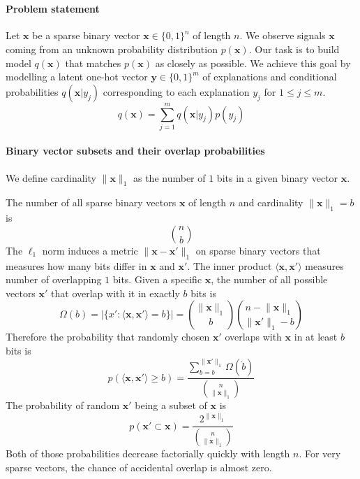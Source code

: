 \documentclass[12pt]{article}
\begin{document}
\section{}

\paragraph{Problem statement} 
Let $\boldsymbol{x}$ be a sparse binary vector $\boldsymbol{x}\in\{0,1\}^n$ of length $n$. We observe signals  $\boldsymbol{x}$ coming from an unknown probability distribution $p(\boldsymbol{x})$. Our task is to build model $q(\boldsymbol{x})$ that matches $p(\boldsymbol{x})$ as closely as possible. We achieve this goal by modelling a latent one-hot vector $\boldsymbol{y}\in\{0,1\}^m$ of explanations and conditional probabilities $q(\boldsymbol{x}|y_j)$ corresponding to each explanation $y_j$ for $1\le j\le m$.
\[
q(\boldsymbol{x}) = \sum_{j=1}^m q(\boldsymbol{x}|y_j)p(y_j)
\]


\paragraph{Binary vector subsets and their overlap probabilities} 

We define cardinality $\lVert\boldsymbol{x}\rVert_1$ as the number of $1$ bits in a given binary vector $\boldsymbol{x}$.

The number of all sparse binary vectors $\boldsymbol{x}$ of length $n$ and cardinality $\lVert\boldsymbol{x}\rVert_1=b$ is
\[\binom{n}{b}\]
The $\ell_1$ norm induces a metric $\lVert\boldsymbol{x}-\boldsymbol{x}'\rVert_1$ on sparse binary vectors that measures how many bits differ in $\boldsymbol{x}$ and $\boldsymbol{x}'$. The inner product $\langle\boldsymbol{x},\boldsymbol{x}'\rangle$ measures number of overlapping $1$ bits. 
Given a specific $\boldsymbol{x}$, the number of all possible vectors $\boldsymbol{x}'$ that overlap with it in exactly $b$ bits is 
\[
\Omega(b)=|\{x':\langle\boldsymbol{x},\boldsymbol{x}'\rangle=b\}|=\binom{\lVert\boldsymbol{x}\rVert_1}{b}\binom{n-\lVert\boldsymbol{x}\rVert_1}{\lVert\boldsymbol{x}'\rVert_1-b}
\]
Therefore the probability that randomly chosen $\boldsymbol{x}'$ overlaps with $\boldsymbol{x}$ in at least $b$ bits is
\[p(\langle\boldsymbol{x},\boldsymbol{x}'\rangle\ge b )=\frac{\sum_{\dot{b}=b}^{\lVert\boldsymbol{x}'\rVert_1}\Omega(\dot{b})}{\binom{n}{\lVert\boldsymbol{x}\rVert_1}}\]
The probability of random $\boldsymbol{x}'$ being a subset of $\boldsymbol{x}$ is
\[p(\boldsymbol{x}'\subset\boldsymbol{x})=\frac{2^{\lVert\boldsymbol{x}\rVert_1}}{\binom{n}{\lVert\boldsymbol{x}\rVert_1}}\]
Both of those probabilities decrease factorially quickly with length $n$. For very sparse vectors, the chance of accidental overlap is almost zero. 
\end{document}
